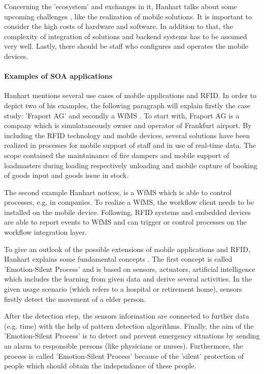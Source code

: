 Concerning the 'ecosystem' and exchanges in it, Hanhart talks about some upcoming challenges \cite[p.212 ff.]{mobile}, like the realization of mobile solutions. It is important to consider the high costs of hardware and software. In addition to that, the complexity of integration of solutions and backend systems has to be assumed very well. Lastly, there should be staff who configures and operates the mobile devices.  

\paragraph{Examples of SOA applications}

Hanhart mentions several use cases of mobile applications and RFID. In order to depict two of his examples, the following paragraph will explain firstly the case study: 'Fraport AG' \cite[p.39 ff.]{mobile} and secondly a \ac{WfMS} \cite[p.204 ff.]{mobile}. To start with, Fraport AG is a company which is simulataneously owner and operator of Frankfurt airport. By including the RFID technology and mobile devices, several solutions have been realized in processes for mobile support of staff and in use of real-time data. The scope contained the maintainance of fire dampers and mobile support of loadmasters during loading respectively unloading and mobile capture of booking of goods input and goods issue in stock. 

The second example Hanhart notices, is a WfMS \cite[p.204 ff.]{mobile} which is able to control processes, e.g. in companies. To realize a WfMS, the workflow client needs to be installed on the mobile device. Following, RFID systems and embedded devices are able to report events to WfMS and can trigger or control processes on the workflow integration layer.
     
To give an outlook of the possible extensions of mobile applications and RFID, Hanhart explains some fundamental concepts \cite[p.208 ff.]{mobile}. The first concept is called 'Emotion-Silent Process' and is based on sensors, actuators, artificial intelligence which includes the learning from given data and derive several activities. In the given usage scenario (which refers to a hospital or retirement home), sensors firstly detect the movement of a elder person.

After the detection step, the sensors information are connected to further data (e.g. time) with the help of pattern detection algorithms. Finally, the aim of the 'Emotion-Silent Process' is to detect and prevent emergency situations by sending an alarm to responsible persons (like physicians or nurses). Furthermore, the process is called 'Emotion-Silent Process' because of the 'silent' protection of people which should obtain the independance of these people.

